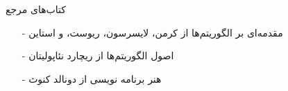 \begin{frame}{کتاب‌های مرجع}
\begin{itemize}\itmsep{5mm}
\item[-]
مقدمه‌ای بر الگوریتم‌ها از کرمن، لایسرسون، ریوست، و استاین
\item[-]
اصول الگوریتم‌ها از ریچارد نئاپولیتان
\item[-]
هنر برنامه نویسی از دونالد کنوث
\end{itemize}
\end{frame}


